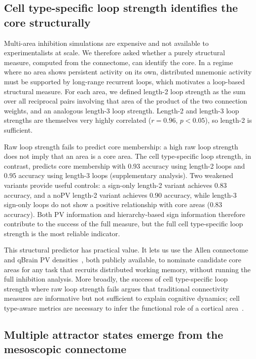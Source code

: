 \documentclass[11pt]{article}
\begin{document}
\subsection{Cell type-specific loop strength identifies the core structurally}

Multi-area inhibition simulations are expensive and not available to experimentalists at scale. We therefore asked whether a purely structural measure, computed from the connectome, can identify the core. In a regime where no area shows persistent activity on its own, distributed mnemonic activity must be supported by long-range recurrent loops, which motivates a loop-based structural measure. For each area, we defined length-2 loop strength as the sum over all reciprocal pairs involving that area of the product of the two connection weights, and an analogous length-3 loop strength. Length-2 and length-3 loop strengths are themselves very highly correlated ($r=0.96$, $p<0.05$), so length-2 is sufficient.

Raw loop strength fails to predict core membership: a high raw loop strength does not imply that an area is a core area. The cell type-specific loop strength, in contrast, predicts core membership with $0.93$ accuracy using length-2 loops and $0.95$ accuracy using length-3 loops (supplementary analysis). Two weakened variants provide useful controls: a sign-only length-2 variant achieves $0.83$ accuracy, and a noPV length-2 variant achieves $0.90$ accuracy, while length-3 sign-only loops do not show a positive relationship with core areas ($0.83$ accuracy). Both PV information and hierarchy-based sign information therefore contribute to the success of the full measure, but the full cell type-specific loop strength is the most reliable indicator.

This structural predictor has practical value. It lets us use the Allen connectome~\cite{oh2014mesoscale,harris2019hierarchical} and qBrain PV densities~\cite{kim2017braintype}, both publicly available, to nominate candidate core areas for any task that recruits distributed working memory, without running the full inhibition analysis. More broadly, the success of cell type-specific loop strength where raw loop strength fails argues that traditional connectivity measures are informative but not sufficient to explain cognitive dynamics; cell type-aware metrics are necessary to infer the functional role of a cortical area~\cite{wang2020macroscopic,fulcher2019overlapping}.

\subsection{Multiple attractor states emerge from the mesoscopic connectome}\label{sec:results-attractors}
\end{document}
